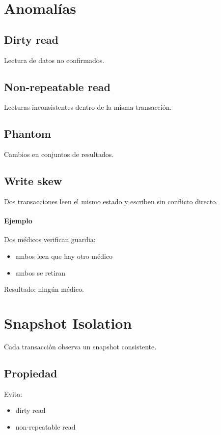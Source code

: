 \documentclass[variant=apuntes,cover=institutional,mode=screen]{ua-engineering-v6-article}
\begin{document}
\section{Anomalías}

\subsection{Dirty read}
Lectura de datos no confirmados.

\subsection{Non-repeatable read}
Lecturas inconsistentes dentro de la misma transacción.

\subsection{Phantom}
Cambios en conjuntos de resultados.

\subsection{Write skew}
Dos transacciones leen el mismo estado y escriben sin conflicto directo.

\paragraph{Ejemplo}
Dos médicos verifican guardia:
\begin{itemize}
\item ambos leen que hay otro médico
\item ambos se retiran
\end{itemize}
Resultado: ningún médico.

\section{Snapshot Isolation}

Cada transacción observa un snapshot consistente.

\subsection{Propiedad}
Evita:
\begin{itemize}
\item dirty read
\item non-repeatable read
\end{itemize}
\end{document}
